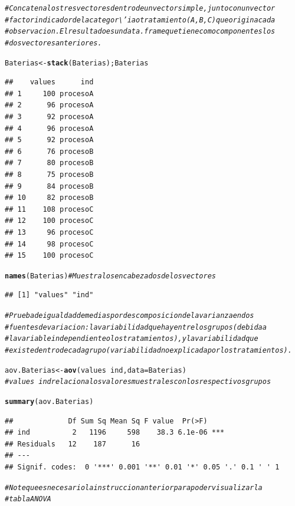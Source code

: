 \documentclass[12pt,letterpaper]{article}\usepackage[]{graphicx}\usepackage[]{color}
\makeatletter
\newcommand{\hlcom}[1]{\textcolor[rgb]{0.678,0.584,0.686}{\textit{#1}}}%
\newcommand{\hlopt}[1]{\textcolor[rgb]{0,0,0}{#1}}%
\newcommand{\hlstd}[1]{\textcolor[rgb]{0.345,0.345,0.345}{#1}}%
\newcommand{\hlkwb}[1]{\textcolor[rgb]{0.69,0.353,0.396}{#1}}%
\newcommand{\hlkwc}[1]{\textcolor[rgb]{0.333,0.667,0.333}{#1}}%
\newcommand{\hlkwd}[1]{\textcolor[rgb]{0.737,0.353,0.396}{\textbf{#1}}}%
\newenvironment{kframe}{%
 \def\at@end@of@kframe{}%
 \ifinner\ifhmode%
  \def\at@end@of@kframe{\end{minipage}}%
  \begin{minipage}{\columnwidth}%
 \fi\fi%
 \def\FrameCommand##1{\hskip\@totalleftmargin \hskip-\fboxsep
 \colorbox{shadecolor}{##1}\hskip-\fboxsep
     \hskip-\linewidth \hskip-\@totalleftmargin \hskip\columnwidth}%
 \MakeFramed {\advance\hsize-\width
   \@totalleftmargin\z@ \linewidth\hsize
   \@setminipage}}%
 {\par\unskip\endMakeFramed%
 \at@end@of@kframe}
\newenvironment{knitrout}{}{} %
\makeatother
\begin{document}
\begin{knitrout}
\color{fgcolor}\begin{kframe}
\begin{alltt}
\hlcom{# Concatena los tres vectores dentro de un vector simple, junto con un vector }
\hlcom{# factor indicador de la categor\textbackslash{}'ia o tratamiento (A, B, C) que origina cada}
\hlcom{# observacion. El resultado es un data.frame que tiene como componentes los }
\hlcom{# dos vectores anteriores.}

\hlstd{Baterias} \hlkwb{<-} \hlkwd{stack}\hlstd{(Baterias); Baterias}
\end{alltt}
\begin{verbatim}
##    values      ind
## 1     100 procesoA
## 2      96 procesoA
## 3      92 procesoA
## 4      96 procesoA
## 5      92 procesoA
## 6      76 procesoB
## 7      80 procesoB
## 8      75 procesoB
## 9      84 procesoB
## 10     82 procesoB
## 11    108 procesoC
## 12    100 procesoC
## 13     96 procesoC
## 14     98 procesoC
## 15    100 procesoC
\end{verbatim}
\begin{alltt}
\hlkwd{names}\hlstd{(Baterias)} \hlcom{# Muestra los encabezados de los vectores}
\end{alltt}
\begin{verbatim}
## [1] "values" "ind"
\end{verbatim}
\begin{alltt}
\hlcom{# Prueba de igualdad de medias por descomposicion de la varianza en dos }
\hlcom{# fuentes de variacion: la variabilidad que hay entre los grupos (debida a }
\hlcom{# la variable independiente o los tratamientos), y la variabilidad que }
\hlcom{# existe dentro de cada grupo (variabilidad no explicada por los tratamientos).}

\hlstd{aov.Baterias} \hlkwb{<-} \hlkwd{aov}\hlstd{(values}\hlopt{~}\hlstd{ind,} \hlkwc{data}\hlstd{=Baterias)}
\hlcom{# values~ind relaciona los valores muestrales con los respectivos grupos}

\hlkwd{summary}\hlstd{(aov.Baterias)}
\end{alltt}
\begin{verbatim}
##             Df Sum Sq Mean Sq F value  Pr(>F)    
## ind          2   1196     598    38.3 6.1e-06 ***
## Residuals   12    187      16                    
## ---
## Signif. codes:  0 '***' 0.001 '**' 0.01 '*' 0.05 '.' 0.1 ' ' 1
\end{verbatim}
\begin{alltt}
\hlcom{# Note que es necesario la instruccion anterior para poder visualizar la }
\hlcom{# tabla ANOVA }
\end{alltt}
\end{kframe}
\end{knitrout}
\end{document}
